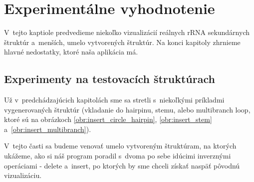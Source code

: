 
\chapter{Experimentálne vyhodnotenie}

V~tejto kaptiole predvedieme niekoľko vizualizácií reálnych rRNA
sekundárnych štruktúr a~menších, umelo vytvorených štruktúr.
Na konci kapitoly zhrnieme hlavné nedostatky, ktoré naša aplikácia má.



\section{Experimenty na testovacích štruktúrach}

Už v~predchádzajúcich kapitolách sme sa stretli s~niekoľkými príkladmi vygenerovaných
štruktúr (vkladanie do hairpinu, stemu, alebo multibranch loop, ktoré sú
na obrázkoch \ref{obr:insert_circle_hairpin}, \ref{obr:insert_stem} a~\ref{obr:insert_multibranch}).

V~tejto časti sa budeme venovať umelo vytvoreným štruktúram, na ktorých ukážeme,
ako si náš program poradil s~dvoma po sebe idúcimi inverznými
operáciami - delete a~insert, po ktorých by sme chceli získať
naspäť pôvodnú vizualizáciu.

